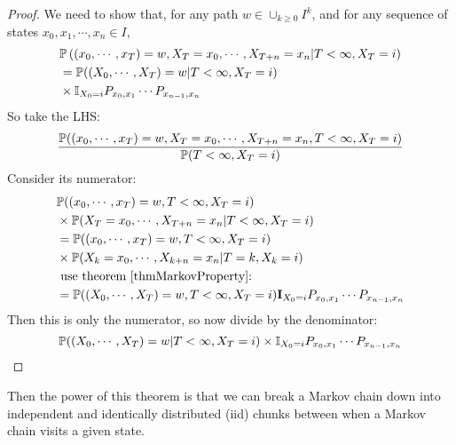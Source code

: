 \documentclass[../Main.tex]{subfiles}
\begin{document}
\begin{proof}
    We need to show that, for any path $w \in \cup_{k \geq 0} I^k$, and for any sequence of states $x_0, x_1, \cdots, x_n \in I$,
    \begin{align*}
        &\P\left((x_0, \cdots, x_T) = w, X_T = x_0, \cdots, X_{T+n} = x_n | T < \infty, X_T = i\right) \\
        &= \P((X_0 ,\cdots, X_T) = w | T < \infty, X_T = i) \\
        &\times \mathbb{I}_{X_0 = i} \Pmat{0}{1} \cdots \Pmat{n-1}{n} 
    \end{align*}
    So take the LHS:
    \begin{equation*}
        \frac{\P((x_0, \cdots, x_T) = w, X_T = x_0, \cdots, X_{T+n} = x_n, T < \infty, X_T = i)}{\P(T < \infty, X_T = i)}
    \end{equation*}
    Consider its numerator:
    \begin{align*}
        &\P((x_0, \cdots, x_T) = w, T < \infty, X_T = i) \\
        &\times \P(X_T = x_0, \cdots, X_{T+n} = x_n | T<\infty, X_T = i) \\
        &= \P((x_0, \cdots, x_T) = w, T < \infty, X_T = i) \\
        &\times \P(X_k = x_0, \cdots, X_{k+n} = x_n | T = k, X_k = i) \\
        &\text{ use theorem~\ref{thmMarkovProperty}:} \\
        &= \P((X_0, \cdots, X_T) = w, T < \infty, X_T = i) \textbf{I}_{X_0 = i} \Pmat{0}{1} \cdots \Pmat{n-1}{n}
    \end{align*}
    Then this is only the numerator, so now divide by the denominator:
    \begin{equation*}
        \P((X_0 ,\cdots, X_T) = w | T < \infty, X_T = i) \times \mathbb{I}_{X_0 = i} \Pmat{0}{1} \cdots \Pmat{n-1}{n} 
    \end{equation*}
\end{proof}
Then the power of this theorem is that we can break a Markov chain down into independent and identically distributed (iid) chunks between when a Markov chain visits a given state.
\end{document}
